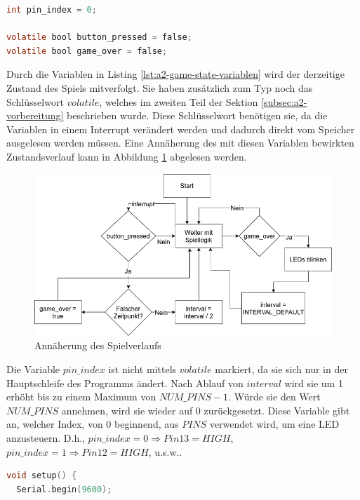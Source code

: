 \begin{lstlisting}[language=C,label={lst:a2-game-state-variablen}, caption={Variablen zur Zustandsbestimmung des Spiels}]
int pin_index = 0;

volatile bool button_pressed = false;
volatile bool game_over = false;
\end{lstlisting}

Durch die Variablen in Listing \ref{lst:a2-game-state-variablen} wird der derzeitige Zustand des Spiels mitverfolgt.
Sie haben zusätzlich zum Typ noch das Schlüsselwort $volatile$, welches im zweiten Teil der Sektion \ref{subsec:a2-vorbereitung} beschrieben wurde.
Diese Schlüsselwort benötigen sie, da die Variablen in einem Interrupt verändert werden und dadurch direkt vom Speicher ausgelesen werden müssen.
Eine Annäherung des mit diesen Variablen bewirkten Zustandsverlauf kann in Abbildung \ref{fig:annäherung-des-spielverlaufs} abgelesen werden.

\begin{figure}[ht]
    \centering
    \includegraphics[width=\textwidth]{pictures/a2-game-state.png}
    \caption{Annäherung des Spielverlaufs}
    \label{fig:annäherung-des-spielverlaufs}
\end{figure}


Die Variable $pin\_index$ ist nicht mittels $volatile$ markiert, da sie sich nur in der Hauptschleife des Programms ändert.
Nach Ablauf von $interval$ wird sie um 1 erhöht bis zu einem Maximum von $NUM\_PINS - 1$.
Würde sie den Wert $NUM\_PINS$ annehmen, wird sie wieder auf 0 zurückgesetzt.
Diese Variable gibt an, welcher Index, von 0 beginnend, aus $PINS$ verwendet wird, um eine LED anzusteuern.
D.h., $pin\_index = 0 \Rightarrow Pin13 = HIGH$, $pin\_index = 1 \Rightarrow Pin12 = HIGH$, u.s.w..

\newpage

\begin{lstlisting}[language=C,label={lst:a2-serial-begin}, caption={Einstellen der seriellen Schnittstelle}]
void setup() {
  Serial.begin(9600);
\end{lstlisting}

